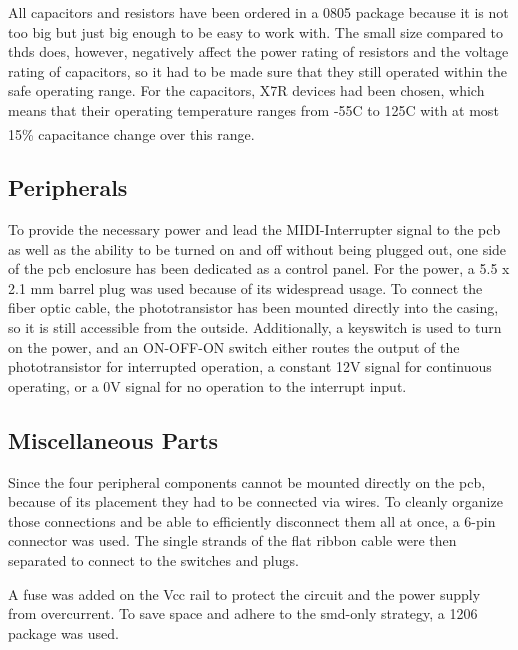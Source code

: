 All capacitors and resistors have been ordered in a 0805 package because it is not too big but just big enough to be easy to work with. The small size compared to \glspl{thd} does, however, negatively affect the power rating of resistors and the voltage rating of capacitors, so it had to be made sure that they still operated within the safe operating range. For the capacitors, X7R devices had been chosen, which means that their operating temperature ranges from -55\textdegree C to 125\textdegree C with at most 15\% capacitance change over this range\textsuperscript{}. %

\subsection{Peripherals}

To provide the necessary power and lead the MIDI-Interrupter signal to the \gls{pcb} as well as the ability to be turned on and off without being plugged out, one side of the \gls{pcb} enclosure has been dedicated as a control panel. %
For the power, a 5.5 x 2.1 mm barrel plug was used because of its widespread usage. To connect the fiber optic cable, the phototransistor has been mounted directly into the casing, so it is still accessible from the outside. Additionally, a keyswitch is used to turn on the power, and an ON-OFF-ON switch either routes the output of the phototransistor for interrupted operation, a constant 12V signal for continuous operating, or a 0V signal for no operation to the interrupt input.

\subsection{Miscellaneous Parts}

Since the four peripheral components cannot be mounted directly on the \gls{pcb}, because of its placement they had to be connected via wires. To cleanly organize those connections and be able to efficiently disconnect them all at once, a 6-pin connector was used. The single strands of the flat ribbon cable were then separated to connect to the switches and plugs.

A fuse was added on the Vcc rail to protect the circuit and the power supply from overcurrent. To save space and adhere to the \gls{smd}-only strategy, a 1206 package was used.

